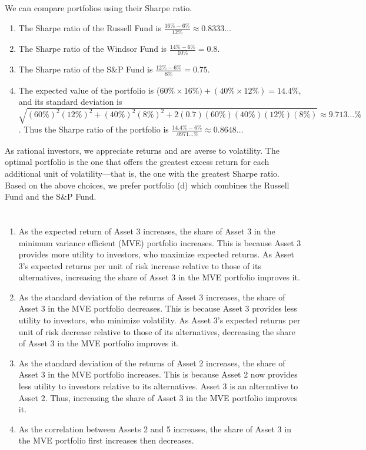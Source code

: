 \documentclass[12pt]{article}
\begin{document}
\section{}
We can compare portfolios using their Sharpe ratio.

\begin{enumerate}
    \item The Sharpe ratio of the Russell Fund is $\frac{16\%-6\%}{12\%}\approx 0.8333\dots$
    \item The Sharpe ratio of the Windsor Fund is $\frac{14\%-6\%}{10\%}=0.8.$
    \item The Sharpe ratio of the S\&P Fund is $\frac{12\%-6\%}{8\%}=0.75.$
    \item The expected value of the portfolio is ($60\%\times 16\%)+(40\%\times 12\%)=14.4\%$, and its standard deviation is $\sqrt{(60\%)^2(12\%)^2+(40\%)^2(8\%)^2+2(0.7)(60\%)(40\%)(12\%)(8\%)}\approx 9.713\dots\%$. Thus the Sharpe ratio of the portfolio is $\frac{14.4\%-6\%}{.0971\dots\%}\approx 0.8648\dots$
\end{enumerate}
As rational investors, we appreciate returns and are averse to volatility. The optimal portfolio is the one that offers the greatest excess return for each additional unit of volatility---that is, the one with the greatest Sharpe ratio. Based on the above choices, we prefer portfolio (d) which combines the Russell Fund and the S\&P Fund.
\section{}
\begin{enumerate}
    \item As the expected return of Asset 3 increases, the share of Asset 3 in the minimum variance efficient (MVE) portfolio increases. This is because Asset 3 provides more utility to investors, who maximize expected returns. As Asset 3's expected returns per unit of risk increase relative to those of its alternatives, increasing the share of Asset 3 in the MVE portfolio improves it. 
    \item As the standard deviation of the returns of Asset 3 increases, the share of Asset 3 in the MVE portfolio decreases. This is because Asset 3 provides less utility to investors, who minimize volatility. As Asset 3's expected returns per unit of risk decrease relative to those of its alternatives, decreasing the share of Asset 3 in the MVE portfolio improves it.
    \item As the standard deviation of the returns of Asset 2 increases, the share of Asset 3 in the MVE portfolio increases. This is because Asset 2 now provides less utility to investors relative to its alternatives. Asset 3 is an alternative to Asset 2. Thus, increasing the share of Asset 3 in the MVE portfolio improves it.
    \item As the correlation between Assets 2 and 5 increases, the share of Asset 3 in the MVE portfolio first increases then decreases.
\end{enumerate}
\end{document}
